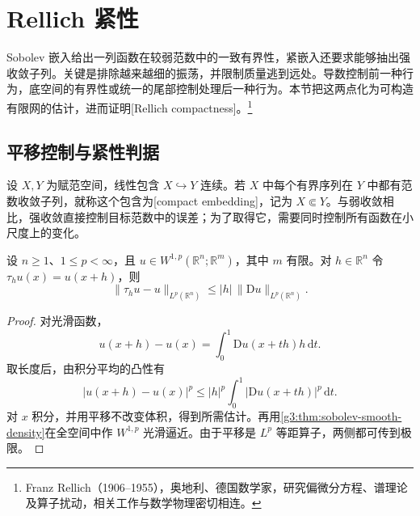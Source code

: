 
% 
% 

\section{Rellich 紧性}
\label{g3:sec:1105}

Sobolev 嵌入给出一列函数在较弱范数中的一致有界性，紧嵌入还要求能够抽出强收敛子列。关键是排除越来越细的振荡，并限制质量逃到远处。导数控制前一种行为，底空间的有界性或统一的尾部控制处理后一种行为。本节把这两点化为可构造有限网的估计，进而证明[Rellich compactness]。\footnote{Franz Rellich（1906--1955），奥地利、德国数学家，研究偏微分方程、谱理论及算子扰动，相关工作与数学物理密切相连。}

\subsection{平移控制与紧性判据}
\label{g3:subsec:1105:01}
设 \(X,Y\) 为赋范空间，线性包含 \(X\hookrightarrow Y\) 连续。若 \(X\) 中每个有界序列在 \(Y\) 中都有范数收敛子列，就称这个包含为[compact embedding]，记为 \(X\Subset Y\)。与弱收敛相比，强收敛直接控制目标范数中的误差；为了取得它，需要同时控制所有函数在小尺度上的变化。

\begin{lemma}\label{g3:lem:sobolev-translation-bound}
	设 \(n\ge1\)、\(1\le p<\infty\)，且 \(u\in W^{1,p}(\mathbb R^n;\mathbb R^m)\)，其中 \(m\) 有限。对 \(h\in\mathbb R^n\) 令 \(\tau_hu(x)=u(x+h)\)，则
	\begin{equation}\label{g3:eq:sobolev-translation-bound}
		\|\tau_hu-u\|_{L^p(\mathbb R^n)}\le|h|\,\|\mathrm D u\|_{L^p(\mathbb R^n)}.
	\end{equation}
\end{lemma}
\begin{proof}
	对光滑函数，
	\[
		u(x+h)-u(x)=\int_0^1\mathrm D u(x+th)h\,\mathrm dt.
	\]
	取长度后，由积分平均的凸性有
	\[
		|u(x+h)-u(x)|^p\le|h|^p\int_0^1|\mathrm D u(x+th)|^p\,\mathrm dt.
	\]
	对 \(x\) 积分，并用平移不改变体积，得到所需估计。再用\cref{g3:thm:sobolev-smooth-density}在全空间中作 \(W^{1,p}\) 光滑逼近。由于平移是 \(L^p\) 等距算子，两侧都可传到极限。
\end{proof}

